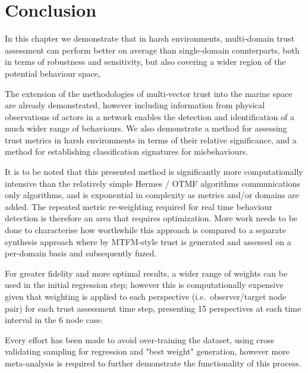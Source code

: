 \section{Conclusion}
In this chapter we demonstrate that in harsh environments, multi-domain trust assessment can perform better on average than single-domain counterparts, both in terms of robustness and sensitivity, but also covering a wider region of the potential behaviour space, 

The extension of the methodologies of multi-vector trust into the marine space are already demonstrated, however including information from physical observations of actors in a network enables the detection and identification of a much wider range of behaviours.
We also demonstrate a method for assessing trust metrics in harsh environments in terms of their relative significance, and a method for establishing classification signatures for misbehaviours.

It is to be noted that this presented method is significantly more computationally intensive than the relatively simple Hermes / OTMF algorithms communications only algorithms, and is exponential in complexity as metrics and/or domains are added. The repeated metric re-weighting required for real time behaviour detection is therefore an area that requires optimization. More work needs to be done to characterise how worthwhile this approach is compared to a separate synthesis approach where by MTFM-style trust is generated and assessed on a per-domain basis and subsequently fuzed.

For greater fidelity and more optimal results, a wider range of weights can be used in the initial regression step; however this is computationally expensive given that weighting is applied to each perspective (i.e.\ observer/target node pair) for each trust assessment time step, presenting 15 perspectives at each time interval in the 6 node case.

Every effort has been made to avoid over-training the dataset, using cross validating sampling for regression and "best weight" generation, however more meta-analysis is required to further demonstrate the functionality of this process.



